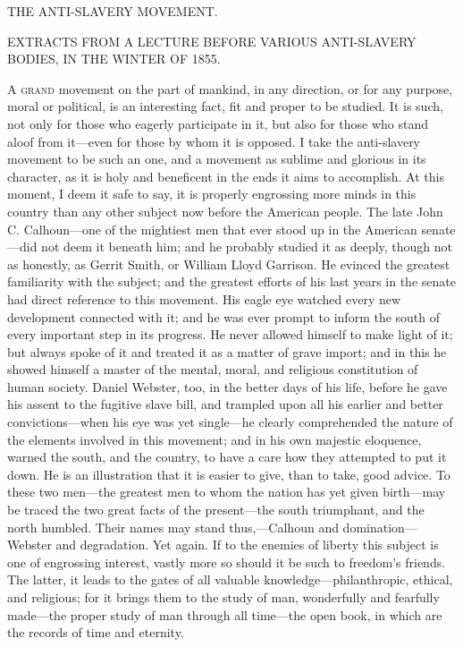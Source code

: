 {}

{THE ANTI-SLAVERY MOVEMENT.}

{EXTRACTS FROM A LECTURE BEFORE VARIOUS ANTI-SLAVERY BODIES, IN THE
WINTER OF 1855.}

\textsc{A grand} movement on the part of mankind, in any direction, or
for any purpose, moral or political, is an interesting fact, fit and
proper to be studied. It is such, not only for those who eagerly
participate in it, but also for those who stand aloof from it---even for
those by whom it is opposed. I take the anti-slavery movement to be such
an one, and a movement as sublime and glorious in its character, as it
is holy and beneficent in the ends it aims to accomplish. At this
moment, I deem it safe to say, it is properly engrossing more minds in
this country than any other subject now before the American people. The
late John C. Calhoun---one of the mightiest men that ever stood up in
the American senate---did not deem it beneath him; and he probably
studied it as deeply, though not as honestly, as Gerrit Smith, or
William Lloyd Garrison. He evinced the greatest familiarity with the
subject; and the greatest efforts of his last years in the senate had
direct reference to this movement. His eagle eye watched every new
development connected with it; and he was ever prompt to inform the
south of every important step in its progress. He never allowed himself
to make light of it; but always spoke of it and treated it as a matter
of grave import; and in this he showed himself a master of the mental,
moral, and religious constitution of human society. Daniel Webster, too,
in the better days of his life, before he gave his assent to the
fugitive slave bill, and trampled upon all his earlier and better
convictions---when his eye was yet single---he clearly comprehended the
nature of the elements involved in this movement; and in his own
majestic eloquence, warned the south, and the country, to have a care
how they attempted to put it down. He is an illustration that it is
easier to give, than to take, good advice. To these two men---the
greatest men to whom the nation has yet given {}birth---may be traced
the two great facts of the present---the south triumphant, and the north
humbled. Their names may stand thus,---Calhoun and domination---Webster
and degradation. Yet again. If to the enemies of liberty this subject is
one of engrossing interest, vastly more so should it be such to
freedom's friends. The latter, it leads to the gates of all valuable
knowledge---philanthropic, ethical, and religious; for it brings them to
the study of man, wonderfully and fearfully made---the proper study of
man through all time---the open book, in which are the records of time
and eternity.

